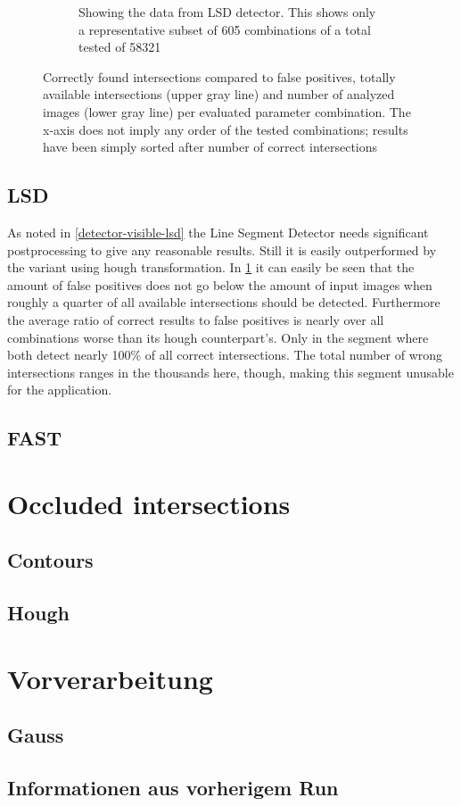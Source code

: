 \begin{figure}
\begin{subfigure}{\textwidth}
			\label{fig:lsdCorrectness}
			\caption{Showing the data from LSD detector. This shows only a representative subset of 605 combinations of a total tested of 58321}
		\end{subfigure}

	\label{fig:linesCorrectness}
	\caption{Correctly found intersections compared to false positives, totally available intersections (upper gray line) and number of analyzed images (lower gray line) per evaluated parameter combination. The x-axis does not imply any order of the tested combinations; results have been simply sorted after number of correct intersections}
	\end{figure}


	\subsection{LSD}
	As noted in \ref{detector-visible-lsd} the Line Segment Detector needs significant postprocessing to give any reasonable results. Still it is easily outperformed by the variant using hough transformation. In \ref{fig:lsdCorrectness} it can easily be seen that the amount of false positives does not go below the amount of input images when roughly a quarter of all available intersections should be detected. Furthermore the average ratio of correct results to false positives is nearly over all combinations worse than its hough counterpart's. Only in the segment where both detect nearly 100\% of all correct intersections. The total number of wrong intersections ranges in the thousands here, though, making this segment unusable for the application.

	\subsection{FAST}

	\section{Occluded intersections}
	\subsection{Contours}
	\subsection{Hough}

	\section{Vorverarbeitung}
	\subsection{Gauss}
	\subsection{Informationen aus vorherigem Run}
